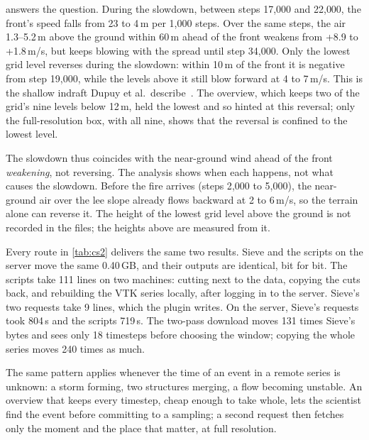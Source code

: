 \documentclass{vgtc}
\newcommand{\sname}{Sieve}
\begin{document}
 answers the question. During the slowdown, between steps 17{,}000
and 22{,}000, the front's speed falls from 23 to 4\,m per 1{,}000 steps. Over the same
steps, the air 1.3--5.2\,m above the ground within 60\,m ahead of the front weakens from
+8.9 to +1.8\,m/s, but keeps blowing with the spread until step 34{,}000. Only the lowest
grid level reverses during the slowdown: within 10\,m of the front it is negative from step
19{,}000, while the levels above it still blow forward at 4 to 7\,m/s. This is the shallow
indraft Dupuy et al.\ describe~\cite{dupuy2011indraft}. The overview, which keeps two of the
grid's nine levels below 12\,m, held the lowest and so hinted at this reversal; only the
full-resolution box, with all nine, shows that the reversal is confined to the lowest
level.

The slowdown thus coincides with the near-ground wind ahead of the front
\emph{weakening}, not reversing. The analysis shows when each happens, not what causes
the slowdown. Before the fire arrives (steps 2{,}000 to 5{,}000), the near-ground air over the lee
slope already flows backward at 2 to 6\,m/s, so the terrain alone can reverse it. The
height of the lowest grid level above the ground is not recorded in the files; the heights
above are measured from it.

Every route in \cref{tab:cs2} delivers the same two results. \sname{} and the scripts on
the server move the same 0.40\,GB, and their outputs are identical, bit for bit. The
scripts take 111 lines on two machines: cutting next to the data, copying the cuts back,
and rebuilding the VTK series locally, after logging in to the server. \sname{}'s two
requests take 9 lines, which the plugin writes. On the server, \sname{}'s requests took
804\,s and the scripts 719\,s. The two-pass download moves 131 times \sname{}'s bytes and
sees only 18 timesteps before choosing the window; copying the whole series moves 240
times as much.

The same pattern applies whenever the time of an event in a remote series is unknown: a
storm forming, two structures merging, a flow becoming unstable. An overview that keeps
every timestep, cheap enough to take whole, lets the scientist find the event before
committing to a sampling; a second request then fetches only the moment and the place
that matter, at full resolution.
\end{document}
